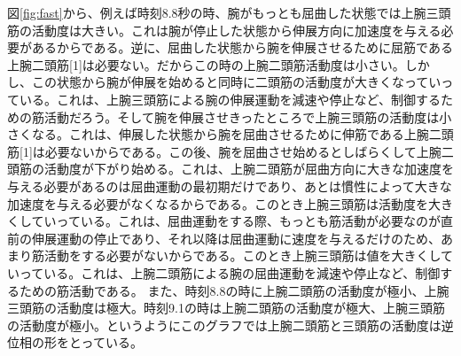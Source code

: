 \documentclass{jsarticle}
\begin{document}
図\ref{fig:fast}から、例えば時刻8.8秒の時、腕がもっとも屈曲した状態では上腕三頭筋の活動度は大きい。これは腕が停止した状態から伸展方向に加速度を与える必要があるからである。逆に、屈曲した状態から腕を伸展させるために屈筋である上腕二頭筋[1]は必要ない。だからこの時の上腕二頭筋活動度は小さい。しかし、この状態から腕が伸展を始めると同時に二頭筋の活動度が大きくなっていっている。これは、上腕三頭筋による腕の伸展運動を減速や停止など、制御するための筋活動だろう。そして腕を伸展させきったところで上腕三頭筋の活動度は小さくなる。これは、伸展した状態から腕を屈曲させるために伸筋である上腕二頭筋[1]は必要ないからである。この後、腕を屈曲させ始めるとしばらくして上腕二頭筋の活動度が下がり始める。これは、上腕二頭筋が屈曲方向に大きな加速度を与える必要があるのは屈曲運動の最初期だけであり、あとは慣性によって大きな加速度を与える必要がなくなるからである。このとき上腕三頭筋は活動度を大きくしていっている。これは、屈曲運動をする際、もっとも筋活動が必要なのが直前の伸展運動の停止であり、それ以降は屈曲運動に速度を与えるだけのため、あまり筋活動をする必要がないからである。このとき上腕三頭筋は値を大きくしていっている。これは、上腕二頭筋による腕の屈曲運動を減速や停止など、制御するための筋活動である。
また、時刻8.8の時に上腕二頭筋の活動度が極小、上腕三頭筋の活動度は極大。時刻9.1の時は上腕二頭筋の活動度が極大、上腕三頭筋の活動度が極小。というようにこのグラフでは上腕二頭筋と三頭筋の活動度は逆位相の形をとっている。
\end{document}
